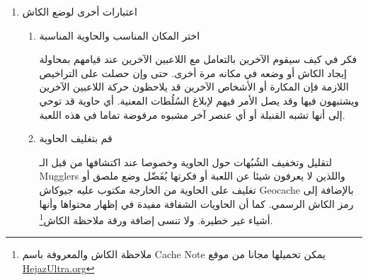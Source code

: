 \documentclass[12pt,a4paper,onecolumn,notitlepage]{book}
\begin{document}
\begin{enumerate}
\begin{enumerate}[
rightmargin=0pt, itemindent=20pt,
labelwidth=15pt, labelsep=5pt, listparindent=0.7cm,
align=right]
كما أن القوانين المحلية قد تكون أكثر صرامة في تحديد الأماكن الممنوعة
\end{enumerate}
\item اعتبارات أخرى لوضع الكاش
\begin{enumerate}[
rightmargin=0pt, itemindent=20pt,
labelwidth=15pt, labelsep=5pt, listparindent=0.7cm,
align=right]
\item اختر المكان المناسب والحاوية المناسبة

فكر في كيف سيقوم الآخرين بالتعامل مع اللاعبين الآخرين عند قيامهم بمحاولة إيجاد الكاش أو وضعه في مكانه مرة أخرى. حتى وإن حصلت على التراخيص اللازمة فإن المكارة أو الأشخاص الآخرين قد يلاحظون حركة اللاعبين الآخرين ويشتبهون فيها وقد يصل الأمر فيهم لإبلاغ السُلُطات المعنية. أي حاوية قد توحي إلى أنها تشبه القنبلة أو أي عنصر آخر مشبوه مرفوضة تماما في هذه اللعبة.
\item قم بتغليف الحاوية

لتقليل وتخفيف الشُبُهات حول الحاوية وخصوصا عند اكتشافها من قبل الـ \textenglish{Mugglers} واللذين لا يعرفون شيئا عن اللعبة أو فكرتها يُفَضّل وضع ملصق أو تغليف على الحاوية من الخارجة مكتوب عليه جيوكاش \textenglish{Geocache} بالإضافة إلى رمز الكاش الرسمي. كما أن الحاويات الشفافة مفيدة في إظهار محتواها وأنها أشياء غير خطيرة. ولا تنسى إضافة ورقة ملاحظة الكاش\footnote{ملاحظة الكاش والمعروفة باسم \textenglish{Cache Note} يمكن تحميلها مجانا من موقع \textenglish{\href{http://www.HejazUltra.org}{HejazUltra.org}}}.
\end{enumerate}

\end{enumerate}
\clearpage

\end{document}
